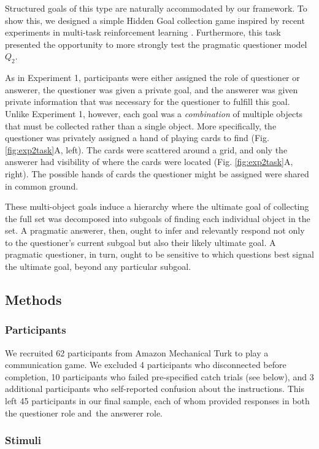 \documentclass[11pt, floatsintext]{apa6}
\begin{document}
Structured goals of this type are naturally accommodated by our framework. 
To show this, we designed a simple Hidden Goal collection game inspired by recent experiments in multi-task reinforcement learning \cite{oh2017zero, andreas2017modular}.
Furthermore, this task presented the opportunity to more strongly test the pragmatic questioner model $Q_2$.


As in Experiment 1, participants were either assigned the role of questioner or answerer, the questioner was given a private goal, and the answerer was given private information that was necessary for the questioner to fulfill this goal.
Unlike Experiment 1, however, each goal was a \emph{combination} of multiple objects that must be collected rather than a single object.
More specifically, the questioner was privately assigned a hand of playing cards to find (Fig. \ref{fig:exp2task}A, left). 
The cards were scattered around a grid, and only the answerer had visibility of where the cards were located (Fig. \ref{fig:exp2task}A, right).
The possible hands of cards the questioner might be assigned were shared in common ground.

These multi-object goals induce a hierarchy where the ultimate goal of collecting the full set was decomposed into subgoals of finding each individual object in the set.
A pragmatic answerer, then, ought to infer and relevantly respond not only to the questioner's current subgoal but also their likely ultimate goal.
A pragmatic questioner, in turn, ought to be sensitive to which questions best signal the ultimate goal, beyond any particular subgoal.


\subsection{Methods}
\subsubsection{Participants}

We recruited 62 participants from Amazon Mechanical Turk to play a communication game.
We excluded 4 participants who disconnected before completion, 10 participants who failed pre-specified catch trials (see below), and 3 additional participants who self-reported confusion about the instructions.
This left 45 participants in our final sample, each of whom provided responses in both the questioner role and the answerer role.

\subsubsection{Stimuli}
\end{document}
